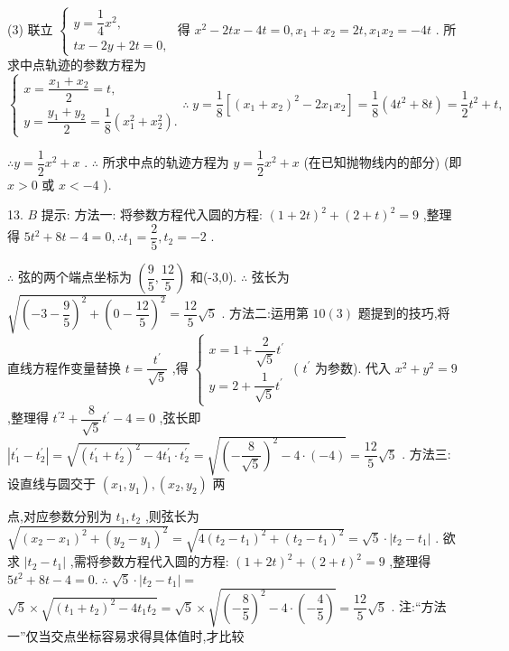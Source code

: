 (3) 联立 $\left\{  \begin{array}{l} y = \dfrac{1}{4}{x}^{2}, \\  {tx} - {2y} + {2t} = 0, \end{array}\right.$ 得 ${x}^{2} - {2tx} - {4t} = 0,{x}_{1} + {x}_{2} = {2t},{x}_{1}{x}_{2} =  - {4t}$ . 所求中点轨迹的参数方程为 $\left\{  {\begin{array}{l} x = \dfrac{{x}_{1} + {x}_{2}}{2} = t, \\  y = \dfrac{{y}_{1} + {y}_{2}}{2} = \dfrac{1}{8}\left( {{x}_{1}^{2} + {x}_{2}^{2}}\right) . \end{array}\therefore \;y = \dfrac{1}{8}\left\lbrack  {{\left( {x}_{1} + {x}_{2}\right) }^{2} - 2{x}_{1}{x}_{2}}\right\rbrack   = \dfrac{1}{8}\left( {4{t}^{2} + {8t}}\right)  = \dfrac{1}{2}{t}^{2} + t,}\right.$

$\therefore y = \dfrac{1}{2}{x}^{2} + x$ . $\therefore$ 所求中点的轨迹方程为 $y = \dfrac{1}{2}{x}^{2} + x$ (在已知抛物线内的部分) (即 $x > 0$ 或 $x <  - 4$ ).

13. $B$ 提示: 方法一: 将参数方程代入圆的方程: ${\left( 1 + 2t\right) }^{2} + {\left( 2 + t\right) }^{2} = 9$ ,整理得 $5{t}^{2} + {8t} - 4 = 0,\therefore {t}_{1} = \dfrac{2}{5},{t}_{2} =  - 2$ .

$\therefore$ 弦的两个端点坐标为 $\left( {\dfrac{9}{5},\dfrac{12}{5}}\right)$ 和(-3,0). $\therefore$ 弦长为 $\sqrt{{\left( -3 - \dfrac{9}{5}\right) }^{2} + {\left( 0 - \dfrac{12}{5}\right) }^{2}} = \dfrac{12}{5}\sqrt{5}$ . 方法二:运用第 ${10}\left( 3\right)$ 题提到的技巧,将直线方程作变量替换 $t = \dfrac{{t}^{\prime }}{\sqrt{5}}$ ,得 $\left\{  \begin{array}{l} x = 1 + \dfrac{2}{\sqrt{5}}{t}^{\prime } \\  y = 2 + \dfrac{1}{\sqrt{5}}{t}^{\prime } \end{array}\right.$ ( ${t}^{\prime }$ 为参数). 代入 ${x}^{2} + {y}^{2} = 9$ ,整理得 ${t}^{\prime 2} + \dfrac{8}{\sqrt{5}}{t}^{\prime } - 4 = 0$ ,弦长即 $\left| {{t}_{1}^{\prime } - {t}_{2}^{\prime }}\right|  = \sqrt{{\left( {t}_{1}^{\prime } + {t}_{2}^{\prime }\right) }^{2} - 4{t}_{1}^{\prime } \cdot  {t}_{2}^{\prime }} = \sqrt{{\left( -\dfrac{8}{\sqrt{5}}\right) }^{2} - 4 \cdot  \left( {-4}\right) } = \dfrac{12}{5}\sqrt{5}$ . 方法三:设直线与圆交于 $\left( {{x}_{1},{y}_{1}}\right) ,\left( {{x}_{2},{y}_{2}}\right)$ 两

点,对应参数分别为 ${t}_{1},{t}_{2}$ ,则弦长为 $\sqrt{{\left( {x}_{2} - {x}_{1}\right) }^{2} + {\left( {y}_{2} - {y}_{1}\right) }^{2}} = \sqrt{4{\left( {t}_{2} - {t}_{1}\right) }^{2} + {\left( {t}_{2} - {t}_{1}\right) }^{2}} = \sqrt{5} \cdot  \left| {{t}_{2} - {t}_{1}}\right|$ . 欲求 $\left| {{t}_{2} - {t}_{1}}\right|$ ,需将参数方程代入圆的方程: ${\left( 1 + 2t\right) }^{2} + {\left( 2 + t\right) }^{2} = 9$ ,整理得 $5{t}^{2} + {8t} - 4 = 0.\;\therefore \;\sqrt{5} \cdot  \left| {{t}_{2} - {t}_{1}}\right|  =$  $\sqrt{5} \times  \sqrt{{\left( {t}_{1} + {t}_{2}\right) }^{2} - 4{t}_{1}{t}_{2}} = \sqrt{5} \times  \sqrt{{\left( -\dfrac{8}{5}\right) }^{2} - 4 \cdot  \left( {-\dfrac{4}{5}}\right) } = \dfrac{12}{5}\sqrt{5}$ . 注:“方法一”仅当交点坐标容易求得具体值时,才比较


